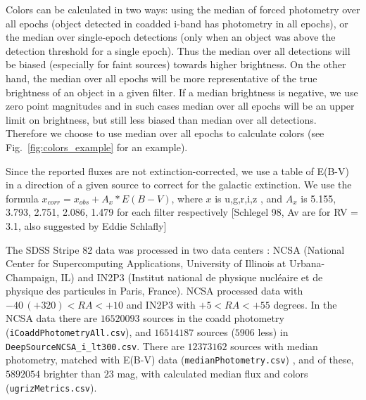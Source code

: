 \documentclass[fleqn,usenatbib]{mnras}  %
\begin{document}
Colors can be calculated in two ways: using the median of forced photometry over all epochs (object detected in coadded i-band has photometry in all epochs), or the median over single-epoch detections (only when an object was above the detection threshold for a single epoch).  
Thus the median over all detections will be biased (especially for faint sources) towards higher brightness.  On the other hand, the median over all epochs will be more representative of the true brightness of an object in a given filter.  If a median brightness is negative, we use zero point magnitudes and in such cases median over all epochs will be an upper limit on brightness, but still less biased than median over all detections. Therefore  we choose to use median over all epochs to calculate colors (see Fig.~\ref{fig:colors_example} for an example).  

Since the reported fluxes are not extinction-corrected, we use a table of E(B-V) in a direction of a given source to correct for the galactic extinction. We use the formula  $x_{corr}  = x_{obs} + A_{x} * E(B-V)$, where $x$ is  u,g,r,i,z , and $A_x$ is 5.155, 3.793, 2.751, 2.086, 1.479  for each filter respectively  [Schlegel 98, Av are for RV = 3.1, also suggested by Eddie Schlafly] 

The SDSS Stripe 82 data was processed in two data centers : NCSA (National Center for Supercomputing Applications, University of Illinois at Urbana-Champaign, IL) and IN2P3  (Institut national de physique nucl\'eaire et de physique des particules in Paris, France). NCSA processed data  with  $-40 \, (+320) < RA < +10 $ and IN2P3 with $ +5 < RA < +55$ degrees. In the NCSA data  there are $16520093$ sources in the coadd photometry (\verb|iCoaddPhotometryAll.csv|), and $16514187$ sources ($5906$ less) in \verb|DeepSourceNCSA_i_lt300.csv|. There are $12373162$ sources with median photometry, matched with E(B-V) data (\verb|medianPhotometry.csv|) , and  of these, $5892054$ brighter than $23$ mag, with calculated median flux and colors (\verb|ugrizMetrics.csv|). 
\end{document}
